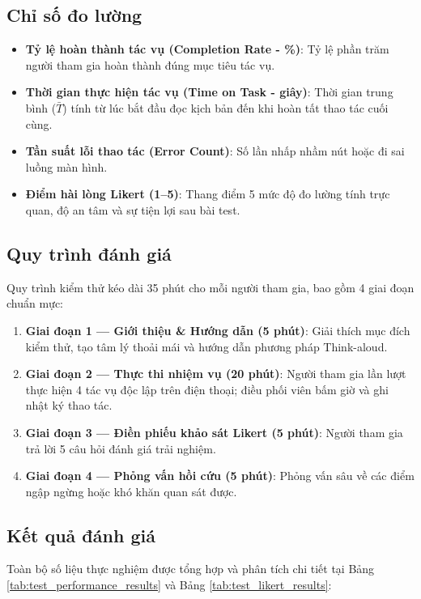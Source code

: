 \subsection{Chỉ số đo lường}
\begin{itemize}
  \item \textbf{Tỷ lệ hoàn thành tác vụ (Completion Rate - \%)}: Tỷ lệ phần trăm người tham gia hoàn thành đúng mục tiêu tác vụ.
  \item \textbf{Thời gian thực hiện tác vụ (Time on Task - giây)}: Thời gian trung bình ($\bar{T}$) tính từ lúc bắt đầu đọc kịch bản đến khi hoàn tất thao tác cuối cùng.
  \item \textbf{Tần suất lỗi thao tác (Error Count)}: Số lần nhấp nhầm nút hoặc đi sai luồng màn hình.
  \item \textbf{Điểm hài lòng Likert (1--5)}: Thang điểm 5 mức độ đo lường tính trực quan, độ an tâm và sự tiện lợi sau bài test.
\end{itemize}

\subsection{Quy trình đánh giá}
Quy trình kiểm thử kéo dài 35 phút cho mỗi người tham gia, bao gồm 4 giai đoạn chuẩn mực:
\begin{enumerate}
  \item \textbf{Giai đoạn 1 --- Giới thiệu \& Hướng dẫn (5 phút)}: Giải thích mục đích kiểm thử, tạo tâm lý thoải mái và hướng dẫn phương pháp Think-aloud.
  \item \textbf{Giai đoạn 2 --- Thực thi nhiệm vụ (20 phút)}: Người tham gia lần lượt thực hiện 4 tác vụ độc lập trên điện thoại; điều phối viên bấm giờ và ghi nhật ký thao tác.
  \item \textbf{Giai đoạn 3 --- Điền phiếu khảo sát Likert (5 phút)}: Người tham gia trả lời 5 câu hỏi đánh giá trải nghiệm.
  \item \textbf{Giai đoạn 4 --- Phỏng vấn hồi cứu (5 phút)}: Phỏng vấn sâu về các điểm ngập ngừng hoặc khó khăn quan sát được.
\end{enumerate}

\subsection{Kết quả đánh giá}
Toàn bộ số liệu thực nghiệm được tổng hợp và phân tích chi tiết tại Bảng \ref{tab:test_performance_results} và Bảng \ref{tab:test_likert_results}:

